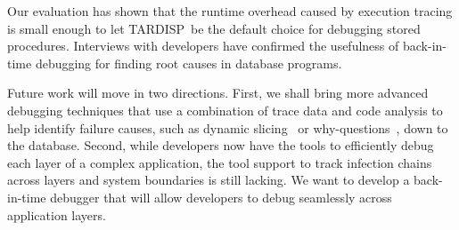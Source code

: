 \documentclass[english,conference]{IEEEtran}
\newcommand{\tool}{TAR\-DISP}
\begin{document}
Our evaluation has shown that the runtime overhead caused by execution tracing is small enough to let \tool\ be the default choice for debugging stored procedures.
Interviews with developers have confirmed the usefulness of back-in-time debugging for finding root causes in database programs.

Future work will move in two directions.
First, we shall bring more advanced debugging techniques that use a combination of trace data and code analysis to help identify failure causes, such as dynamic slicing~\cite{agrawal_dynamic_1990} or why-questions~\cite{ko_debugging_2008}, down to the database.
Second, while developers now have the tools to efficiently debug each layer of a complex application, the tool support to track infection chains across layers and system boundaries is still lacking.
We want to develop a back-in-time debugger that will allow developers to debug seamlessly across application layers.


%

\end{document}
